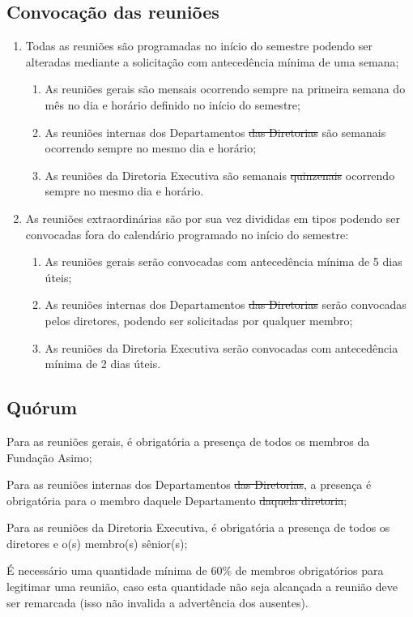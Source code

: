     \subsection{Convocação das reuniões}
    \begin{enumerate}
        \item Todas as reuniões são programadas no início do semestre podendo ser alteradas mediante a solicitação com antecedência mínima de uma semana;
        \begin{enumerate}
            \item As reuniões gerais são mensais ocorrendo sempre na primeira semana do mês no dia e horário definido no início do semestre;
            \item As reuniões internas {\color{red}dos Departamentos} {\color{cyan}\sout {das Diretorias}} são semanais ocorrendo sempre no mesmo dia e horário;
            \item As reuniões da Diretoria Executiva são {\color{red}semanais} {\color{cyan}\sout{ quinzenais}} ocorrendo sempre no mesmo dia e horário.
        \end{enumerate}
        \item As reuniões extraordinárias são por sua vez divididas em tipos podendo ser convocadas fora do calendário programado no início do semestre: 
        \begin{enumerate}
            \item As reuniões gerais serão convocadas com antecedência mínima de 5 dias úteis;
            \item As reuniões internas {\color{red}dos Departamentos} {\color{cyan}\sout {das Diretorias}} serão convocadas pelos diretores, podendo ser solicitadas por qualquer membro;
            \item As reuniões da Diretoria Executiva serão convocadas com antecedência mínima de 2 dias úteis.
        \end{enumerate}
    \end{enumerate}
    \subsection{Quórum}

        \begin{enumerate}
            \item Para as reuniões gerais, é obrigatória a presença de todos os membros da Fundação Asimo;
            \item Para as reuniões internas {\color{red}dos Departamentos} {\color{cyan}\sout {das Diretorias}}, a presença é obrigatória para o membro {\color{red}daquele Departamento} {\color{cyan}\sout {daquela diretoria}};
            \item Para as reuniões da Diretoria Executiva, é obrigatória a presença de todos os diretores {\color{red} e o(s) membro(s) sênior(s)};
            {\color{red} \item É necessário uma quantidade mínima de 60$\%$ de membros obrigatórios para legitimar uma reunião, caso esta quantidade não seja alcançada a reunião deve ser remarcada (isso não invalida a advertência dos ausentes).}
        \end{enumerate}

